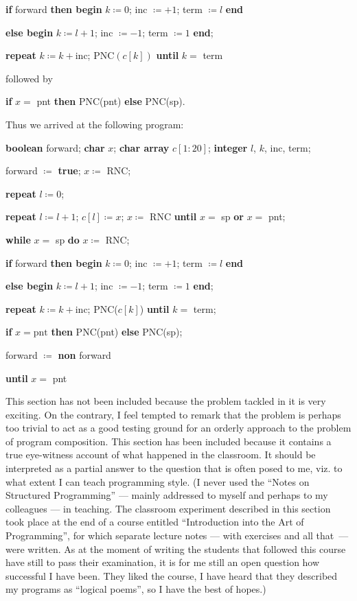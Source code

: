 \quad \textbf{if} forward \textbf{then begin} $k \coloneq 0$; inc $\coloneq + 1$; term $\coloneq l$ \textbf{end}

\tabto{5.8em}\quad \textbf{else begin} $k \coloneq l + 1$; inc $\coloneq -1$; term $\coloneq 1$ \textbf{end};

\quad \textbf{repeat} $k \coloneq k + \text{inc}$; $\text{PNC}(c[k])$ \textbf{until} $k =$ term

\noindent
followed by

\quad \textbf{if} $x =$ pnt \textbf{then} PNC(pnt) \textbf{else} PNC(sp).

Thus we arrived at the following program:

\quad \textbf{boolean} forward; \textbf{char} $x$; \textbf{char array} $c[1:20]$; \textbf{integer} $l$, $k$, inc, term;

\quad forward $\coloneq$ \textbf{true}; $x \coloneq$ RNC;

\quad \textbf{repeat} $l \coloneq 0$;

\quad \quad \textbf{repeat} $l\coloneq l + 1$; $c[l]\coloneq x$; $x \coloneq$ RNC \textbf{until} $x =$ sp \textbf{or} $x =$ pnt;

\quad \quad \textbf{while} $x =$ sp \textbf{do} $x\coloneq$ RNC;

\quad \quad \textbf{if} forward \textbf{then begin} $k\coloneq 0$; inc $\coloneq + 1$; term $\coloneq l$ \textbf{end}

\quad \quad\quad \textbf{else begin} $k\coloneq l + 1$; inc $\coloneq -1$; term $\coloneq 1$ \textbf{end};

\quad \quad \textbf{repeat} $k\coloneq k + \text{inc}$; PNC($c[k]$) \textbf{until} $k =$ term;

\quad \quad \textbf{if} $x = \text{pnt}$ \textbf{then} PNC(pnt) \textbf{else} PNC(sp);

\quad \quad forward $\coloneq$ \textbf{non} forward

\quad \textbf{until} $x =$ pnt

This section has not been included because the problem tackled in it is very exciting. On the contrary, I feel tempted to remark that the problem is perhaps too trivial to act as a good testing ground for an orderly approach to the problem of program composition. This section has been included because it contains a true eye-witness account of what happened in the classroom. It should be interpreted as a partial answer to the question that is often posed to me, viz. to what extent I can teach programming style. (I never used the ``Notes on Structured Programming'' --- mainly addressed to myself and perhaps to my colleagues --- in teaching. The classroom experiment described in this section took place at the end of a course entitled ``Introduction into the Art of Programming'', for which separate lecture notes --- with exercises and all \mbox{that ---} were written. As at the moment of writing the students that followed this course have still to pass their examination, it is for me still an open question how successful I have been. They liked the course, I have heard that they described my programs as ``logical poems'', so I have the best of hopes.)

